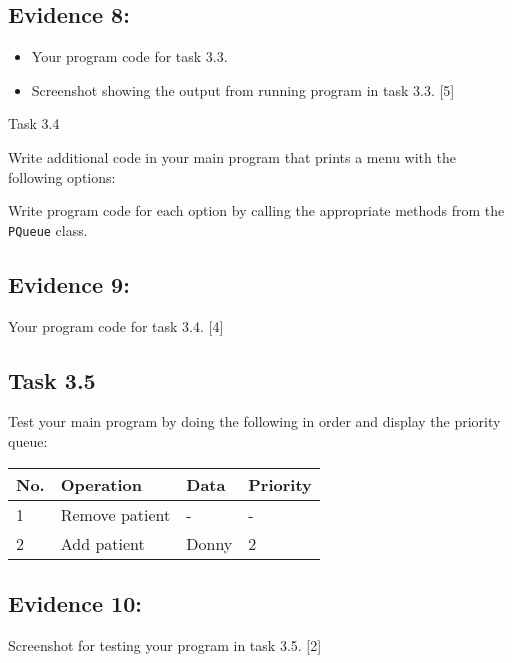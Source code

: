 \subsection*{Evidence 8: }
\begin{itemize}
\item Your program code for task 3.3. 
\item Screenshot showing the output from running program in task 3.3. \hfill{}{[}5{]}
\end{itemize}
Task 3.4 

Write additional code in your main program that prints a menu with
the following options:

\noindent{}

Write program code for each option by calling the appropriate methods
from the \texttt{PQueue} class. 

\subsection*{Evidence 9: }

Your program code for task 3.4.\hfill{} {[}4{]}

\subsection*{Task 3.5 }

Test your main program by doing the following in order and display
the priority queue: 
\noindent \begin{center}
\begin{tabular}{|l|l|l|l|}
\hline 
No. & Operation & Data  & Priority\tabularnewline
\hline 
1 & Remove patient & - & -\tabularnewline
\hline 
2 & Add patient & Donny & 2\tabularnewline
\hline 
\end{tabular} 
\par\end{center}

\subsection*{Evidence 10: }

Screenshot for testing your program in task 3.5.\hfill{} {[}2{]}